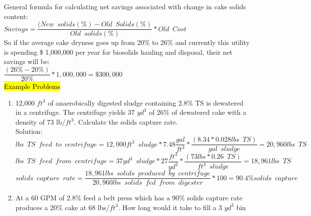 General formula for calculating net savings associated with change in cake solids content:\\
\vspace{0.2cm}
$Savings = \dfrac{(New \enspace solids(\%) - Old \enspace Solids(\%)}{Old \enspace solids(\%)}*Old \enspace Cost$\\
So if the average cake dryness goes up from 20\% to 26\% and currently this utility is spending \$ 1,000,000 per
year for biosolids hauling and disposal, their net savings will be:\\
\vspace{0.2cm}
$\dfrac{(26\%-20\%)}{20\%}* 1,000,000 = \$300,000$\\
\vspace{0.2cm}
\hl{Example Problems}\\
\begin{enumerate}[1.]


\item 12,000 $ft^3$ of anaerobically digested sludge containing 2.8\% TS is dewatered in a centrifuge.  The centrifuge yields 37 $yd^3$ of 26\% of dewatered cake with a density of 73 lb/$ft^3$.  Calculate the solids capture rate.\\


 
\vspace{0.1cm}
Solution:\\
\vspace{0.1cm}
$
    lbs \enspace TS \enspace feed \enspace to \enspace centrifuge
    =
    12,000 ft^3 \enspace sludge
    *
    7.48 
    \dfrac
    {
    gal
    }
    {
    ft^3
    }
    *
    \dfrac
    {
    (8.34*0.028 lbs \enspace TS )
    }
    {gal \enspace sludge
    }
    =20,960 {lbs \enspace TS}
$
\vspace{0.2cm}
$
    lbs \enspace TS \enspace feed \enspace from \enspace centrifuge
    =
    37 yd^3 \enspace sludge
    *
    27 
    \dfrac
    {
    ft^3
    }
    {
    yd^3
    }
    *
    \dfrac
    {
    (73 lbs *0.26 \enspace TS )
    }
    {ft^3 \enspace sludge
    }
    =18,961 {lbs \enspace TS}
$
\vspace{0.2cm}
$
    solids \enspace capture \enspace rate
    =
    \dfrac
    {
    18,961 lbs \enspace solids \enspace produced        \enspace by \enspace centrifuge
    }
    {
    20,960 lbs \enspace solids \enspace fed             \enspace from \enspace digester
    }
    *
    100 
    =\boxed
    {
    90.4\% solids \enspace capture
    }
$

\vspace{0.2cm}
\item At a 60 GPM of 2.8\% feed a belt press which has a 90\% solids capture rate produces a 20\% cake at 68 lbs/$ft^3$.  How long would it take to fill a 3 $yd^3$ bin  
\vspace{0.2cm}   
    

\end{enumerate}
